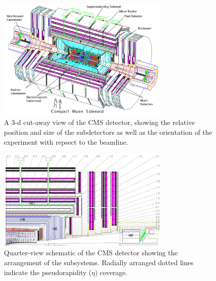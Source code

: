 \begin{figure}[htb]
\centering
\includegraphics[width=0.75\textwidth]{plots/CMS/cms.png}
\caption{A 3-d cut-away view of the CMS detector, showing the relative position and size of the subdetectors as well as the orientation of the experiment with repsect to the beamline.}
\label{fig:cms:cms_full} 
\end{figure}

\begin{figure}[htb]
\centering
\includegraphics[width=0.75\textwidth]{plots/CMS/cms_quarter.png}
\caption{Quarter-view schematic of the CMS detector showing the arrangement of the subsystems. Radially arranged dotted lines indicate the pseudorapidity ($\eta$) coverage.}
\label{fig:cms:cms_quarter}
\end{figure}
